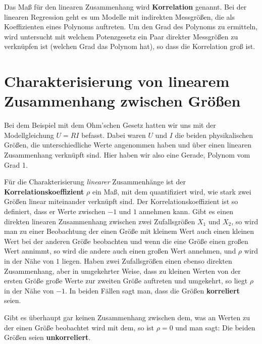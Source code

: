 Das Maß für den linearen Zusammenhang wird \textbf{Korrelation} genannt.
Bei der linearen Regression geht es um Modelle mit indirekten Messgrößen,
die als Koeffizienten eines Polynoms auftreten. Um den Grad des Polynoms zu ermitteln, wird untersucht
mit welchem Potenzgesetz ein Paar direkter Messgrößen zu verknüpfen ist (welchen Grad das Polynom hat),
so dass die Korrelation groß ist.


\section{Charakterisierung von linearem Zusammenhang zwischen Größen}


Bei dem Beispiel mit dem Ohm'schen Gesetz hatten wir uns mit der Modellgleichung $U = R I$ befasst.
Dabei waren $U$ und $I$ die beiden physikalischen Größen, die unterschiedliche Werte angenommen haben und
über einen linearen Zusammenhang verknüpft sind. Hier haben wir also eine Gerade, Polynom vom Grad 1.

Für die Charakterisierung \textsl{linearer} Zusammenhänge ist der
\textbf{Korrelationskoeffizient} $\rho$ ein Maß, mit dem quantifiziert wird, wie
stark zwei Größen linear miteinander verknüpft sind.
Der Korrelationskoeffizient ist so definiert, dass er Werte zwischen $-1$ und
$1$ annehmen kann. Gibt es einen direkten linearen Zusammenhang zwischen zwei Zufallsgrößen
$X_1$ und $X_2$, so wird man zu einer Beobachtung der einen Größe mit kleinem Wert
auch einen kleinen Wert bei der anderen Größe beobachten und wenn die eine Größe einen
großen Wert annimmt, so wird die andere auch einen großen Wert annehmen, und
$\rho$ wird in der Nähe von $1$ liegen. Haben zwei Zufallsgrößen einen ebenso
direkten Zusammenhang, aber in umgekehrter Weise, dass zu kleinen Werten von der ersten
Größe große Werte zur zweiten Größe auftreten und umgekehrt, so liegt $\rho$ in der Nähe von $-1$.
In beiden Fällen sagt man, dass die Größen \textbf{korreliert} seien.

Gibt es überhaupt gar keinen Zusammenhang zwischen dem, was an Werten zu der einen Größe beobachtet
wird mit dem, so ist $\rho = 0$ und man sagt: Die beiden Größen seien \textbf{unkorreliert}.

